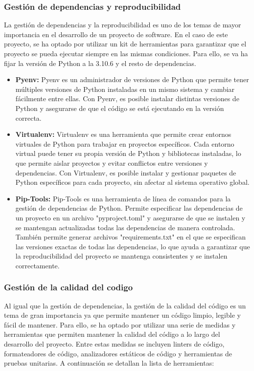 \subsubsection{Gestión de dependencias y reproducibilidad}
La gestión de dependencias y la reproducibilidad es uno de los temas de mayor importancia en el 
desarrollo de un proyecto de software. En el caso de este proyecto, se ha optado por utilizar 
un kit de herramientas para garantizar que el proyecto se pueda ejecutar siempre en las mismas 
condiciones. Para ello, se va ha fijar la versión de Python a la 3.10.6 y el resto de dependencias. 

\begin{itemize}
    \item \textbf{Pyenv: } Pyenv es un administrador 
    de versiones de Python que permite tener múltiples versiones de Python instaladas en un mismo sistema 
    y cambiar fácilmente entre ellas. Con Pyenv, es posible instalar distintas versiones de 
    Python y asegurarse de que el código se está ejecutando en la versión correcta. 
    
    \item \textbf{Virtualenv: } Virtualenv es una herramienta que permite crear entornos virtuales de Python para trabajar 
    en proyectos específicos. Cada entorno virtual puede tener su propia versión de Python y bibliotecas instaladas, 
    lo que permite aislar proyectos y evitar conflictos entre versiones y dependencias. Con Virtualenv, 
    es posible instalar y gestionar paquetes de Python específicos para cada proyecto, sin afectar 
    al sistema operativo global.

    \item \textbf{Pip-Tools: } Pip-Tools es una herramienta de línea de comandos para la gestión de 
    dependencias de Python. Permite especificar las dependencias de un proyecto en un archivo 
    "pyproject.toml" y asegurarse de que se instalen y se mantengan actualizadas todas las dependencias 
    de manera controlada. También permite generar archivos "requirements.txt" en el que se especifican las 
    versiones exactas de todas las dependencias, lo que ayuda a garantizar que la reproducibilidad del 
    proyecto se mantenga consistentes y se instalen correctamente.

\end{itemize}


\subsubsection{Gestión de la calidad del codigo}
Al igual que la gestión de dependencias, la gestión de la calidad del código es un tema de gran importancia
ya que permite mantener un código limpio, legible y fácil de mantener. Para ello, se ha optado por utilizar
una serie de medidas y herramientas que permiten mantener la calidad del código a lo largo del desarrollo del proyecto.
Entre estas medidas se incluyen linters de código, formateadores de código, analizadores estáticos de código y
herramientas de pruebas unitarias. A continuación se detallan la lista de herramientas:

